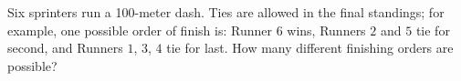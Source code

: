 Six sprinters run a 100-meter dash. Ties are allowed in the final standings; for example, one possible order of finish is: Runner $6$ wins, Runners $2$ and $5$ tie for second, and Runners $1$, $3$, $4$ tie for last. How many different finishing orders are possible?
